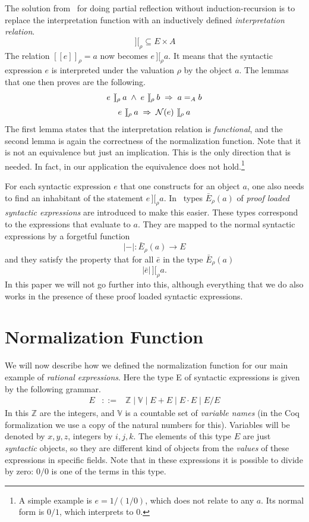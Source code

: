\documentclass[runningheads]{llncs}
\newcommand{\inte}[1]{[\![#1]\!]}
\newcommand{\intfun}[1]{\inte{#1}_\rho}
\newcommand{\intII}{\,]\![}
\newcommand{\intrel}{\mathbin{\intII_\rho}}
\newcommand{\N}{{\cal N}}
\newcommand{\alt}{\mathrel{|}}
\newcommand{\Z}{{\mathbb Z}}
\newcommand{\V}{{\mathbb V}}
\begin{document}
The solution from~\cite{geu:wie:zwa:00} for doing partial reflection without induction-recursion
is to replace the
interpretation function with an inductively defined \emph{interpretation relation}.
$$\intrel \subseteq E \times A$$
The relation $\intfun{e} = a$ now becomes $e \intrel a$.
It means that the syntactic expression $e$ is
interpreted under the valuation $\rho$ by the object $a$.
%
The lemmas that one then proves are the following.
$$
\begin{array}{c}
e \intrel a \;\land\; e \intrel b \;\Rightarrow\; a =_A b\\
\noalign{\medskip}
e \intrel a \;\Rightarrow\; \N(e) \intrel a
\end{array}
$$
The first lemma states that the interpretation relation is \emph{functional},
and the second lemma is again the correctness of the normalization function.
Note that it is not an equivalence but just an implication.
This is the only direction that is needed.
In fact, in our application the equivalence does not hold.\footnote{A
simple example is $e=1/(1/0)$, which does not relate to any $a$.
Its normal form is $0/1$, which interprets to $0$.}

For each syntactic expression $e$ that one constructs for an
object $a$,
one also needs to find an inhabitant of the statement $e \intrel a$.
In~\cite{geu:wie:zwa:00} types $\bar E_\rho(a)$ of \emph{proof loaded syntactic
expressions} are introduced to make this easier.
These types correspond to the expressions that evaluate to $a$.
They are mapped to the normal syntactic expressions by a forgetful function
$$|\mathord{-}| : \bar E_\rho(a) \to E$$
and they satisfy the property that for all $\bar e$ in the type $\bar E_\rho(a)$
$$|{\bar e}| \intrel a.$$
In this paper we will not go further into this,
although everything that we do also works in the presence of these proof loaded
syntactic expressions.


\section{Normalization Function}\label{normalization} %

We will now describe how we defined the normalization function for our
main example of \emph{rational expressions}.
Here the type E of syntactic expressions is given by the following
grammar.
\begin{eqnarray*}
E &::=& \Z \alt \V \alt E+E \alt E\cdot E \alt E/E
\end{eqnarray*}
In this $\Z$ are the integers, and $\V$ is a countable set of
\emph{variable names} (in the Coq formalization we use a copy of the natural
numbers for this).
Variables will be denoted by $x,y,z$, integers by $i,j,k$.
The elements of this type $E$ are just \emph{syntactic} objects, so they are
different kind of objects
from the \emph{values} of these expressions in specific fields.
Note that in these expressions it is possible to divide by zero: $0/0$ is
one of the terms in this type.
\end{document}
